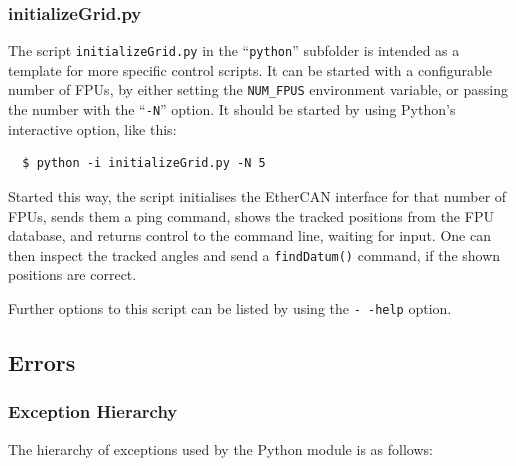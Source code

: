 \documentclass[11pt,a4paper]{scrartcl}
\begin{document}
\subsubsection{initializeGrid.py}
\label{sec:initializegrid}

The script \texttt{initializeGrid.py} in the ``\texttt{python}''
subfolder is intended as a template for more specific control scripts.
It can be started with a configurable number of FPUs, by either
setting the \texttt{NUM\_FPUS} environment variable, or passing the
number with the ``\texttt{-N}'' option. It should be started by using
Python's interactive option, like this:

\begin{verbatim}
  $ python -i initializeGrid.py -N 5
\end{verbatim}

Started this way, the script initialises the EtherCAN interface for that number of
FPUs, sends them a ping command, shows the tracked positions from the
FPU database, and returns control to the command line, waiting for
input. One can then inspect the tracked angles and send a
\texttt{findDatum()} command, if the shown positions are correct.

Further options to this script can be listed by using the
\texttt{-\,-help} option.


\subsection{Errors}
\label{sec:errors}

\subsubsection{Exception Hierarchy}
\label{sec:ExceptionsReference}
The hierarchy of exceptions used by the Python module is as follows:
\end{document}
